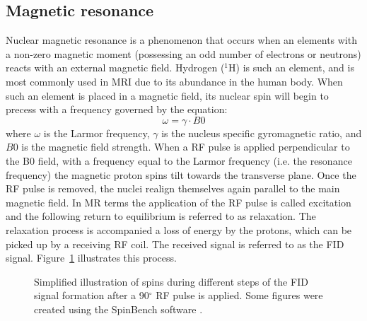 \subsection*{Magnetic resonance}
Nuclear magnetic resonance is a phenomenon that occurs when an elements with a non-zero magnetic moment (possessing an odd number of electrons or neutrons) reacts with an external magnetic field. Hydrogen ($^1$H) is such an element, and is most commonly used in MRI due to its abundance in the human body. When such an element is placed in a magnetic field, its nuclear spin will begin to precess with a frequency governed by the equation:
\begin{equation}
\omega =\gamma \cdot B0 
\end{equation}
where $\omega$ is the Larmor frequency, $\gamma$ is the nucleus specific gyromagnetic ratio, and $B0$ is the magnetic field strength. When a \gls{RF} pulse is applied perpendicular to the B0 field, with a frequency equal to the Larmor frequency (i.e. the resonance frequency) the magnetic proton spins tilt towards the transverse plane. Once the \gls{RF} pulse is removed, the nuclei realign themselves again parallel to the main magnetic field. In MR terms the application of the \gls{RF} pulse is called excitation and the following return to equilibrium is referred to as relaxation. The relaxation process is accompanied a loss of energy by the protons, which can be picked up by a receiving RF coil. The received signal is referred to as the \gls{FID} signal. Figure~\ref{fig:chapter2 spin FIDs} illustrates this process. 

\begin{figure}[H]
\centering
{}
\caption{Simplified illustration of spins during different steps of the FID signal formation after a 90$^\circ$ RF pulse is applied. Some figures were created using the SpinBench software \citep{Overall:2007}.}
\label{fig:chapter2 spin FIDs}
\end{figure}

